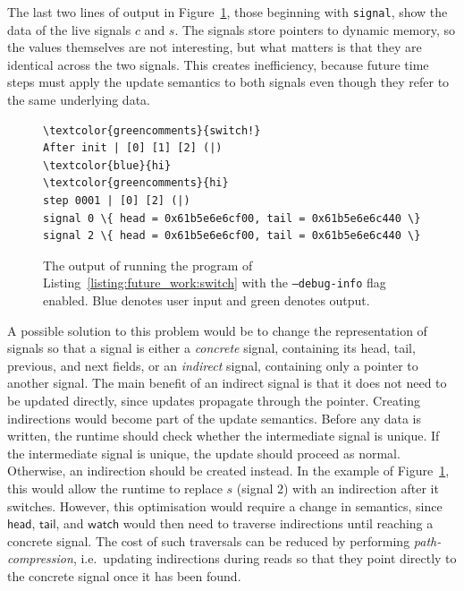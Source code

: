 The last two lines of output in Figure~\ref{figure:future_work:switch_out}, those beginning with \texttt{signal}, show the data of the live signals $c$ and $s$.
The signals store pointers to dynamic memory, so the values themselves are not interesting, but what matters is that they are identical across the two signals.
This creates inefficiency, because future time steps must apply the update semantics to both signals even though they refer to the same underlying data.

\begin{figure}
\begin{Verbatim}[commandchars=\\\{\}]
\textcolor{greencomments}{switch!}
After init | [0] [1] [2] (|)
\textcolor{blue}{hi}
\textcolor{greencomments}{hi}
step 0001 | [0] [2] (|)
signal 0 \{ head = 0x61b5e6e6cf00, tail = 0x61b5e6e6c440 \}
signal 2 \{ head = 0x61b5e6e6cf00, tail = 0x61b5e6e6c440 \}
\end{Verbatim}
\caption{The output of running the program of Listing~\ref{listing:future_work:switch} with the \texttt{--debug-info} flag enabled. Blue denotes user input and green denotes output.}
\label{figure:future_work:switch_out}
\end{figure}

A possible solution to this problem would be to change the representation of signals so that a signal is either a \textit{concrete} signal, containing its head, tail, previous, and next fields, or an \textit{indirect} signal, containing only a pointer to another signal.
The main benefit of an indirect signal is that it does not need to be updated directly, since updates propagate through the pointer. 
Creating indirections would become part of the update semantics. Before any data is written, the runtime should check whether the intermediate signal is unique.
If the intermediate signal is unique, the update should proceed as normal. Otherwise, an indirection should be created instead. 
In the example of Figure~\ref{figure:future_work:switch_out}, this would allow the runtime to replace $s$ (signal $2$) with an indirection after it switches.
However, this optimisation would require a change in semantics, since $\mathsf{head}$, $\mathsf{tail}$, and $\mathsf{watch}$ would then need to traverse indirections until reaching a concrete signal. The cost of such traversals can be reduced by performing \textit{path-compression}, i.e.\ updating indirections during reads so that they point directly to the concrete signal once it has been found.

